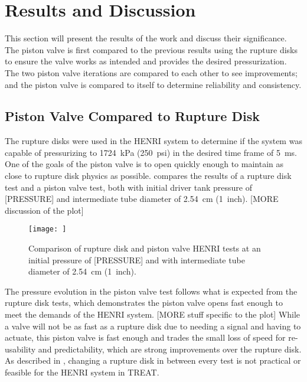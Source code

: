 \section{Results and Discussion} \label{s:results}
This section will present the results of the work and discuss their significance. The piston valve is first compared to the previous results using the rupture disks to ensure the valve works as intended and provides the desired pressurization. The two piston valve iterations are compared to each other to see improvements; and the piston valve is compared to itself to determine reliability and consistency.

\subsection{Piston Valve Compared to Rupture Disk} \label{s:disk v piston}
The rupture disks were used in the HENRI system to determine if the system was capable of pressurizing to \SI{1724}{\kilo\pascal} (\SI{250}{psi}) in the desired time frame of \SI{5}{\milli\second}\cite{HeNURETH}. One of the goals of the piston valve is to open quickly enough to maintain as close to rupture disk physics as possible. 
 compares the results of a rupture disk test and a piston valve test, both with initial driver tank pressure of [PRESSURE] and intermediate tube diameter of \SI{2.54}{\centi\meter} (\SI{1}{inch}). [MORE discussion of the plot]

\begin{figure}[htbp]
    \vspace{16pt}
    \centering
    \texttt{[image: ]}
    \caption{Comparison of rupture disk and piston valve HENRI tests at an initial pressure of [PRESSURE] and with intermediate tube diameter of \SI{2.54}{\centi\meter} (\SI{1}{inch}).}
    \label{fig:disk v piston}
    \vspace{16pt}
\end{figure}

The pressure evolution in the piston valve test follows what is expected from the rupture disk tests, which demonstrates the piston valve opens fast enough to meet the demands of the HENRI system. [MORE stuff specific to the plot] While a valve will not be as fast as a rupture disk due to needing a signal and having to actuate, this piston valve is fast enough and trades the small loss of speed for re-usability and predictability, which are strong improvements over the rupture disk. As described in , changing a rupture disk in between every test is not practical or feasible for the HENRI system in TREAT.



